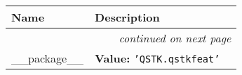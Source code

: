     \vspace{-1cm}
\hspace{\varindent}\begin{longtable}{|p{\varnamewidth}|p{\vardescrwidth}|l}
\cline{1-2}
\cline{1-2} \centering \textbf{Name} & \centering \textbf{Description}& \\
\cline{1-2}
\endhead\cline{1-2}\multicolumn{3}{r}{\small\textit{continued on next page}}\\\endfoot\cline{1-2}
\endlastfoot\raggedright \_\-\_\-p\-a\-c\-k\-a\-g\-e\-\_\-\_\- & \raggedright \textbf{Value:} 
{\tt \texttt{'}\texttt{QSTK.qstkfeat}\texttt{'}}&\\
\cline{1-2}
\end{longtable}

